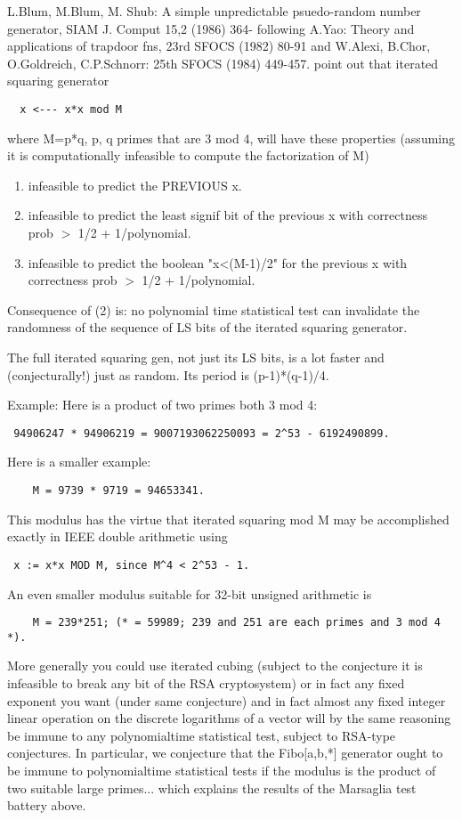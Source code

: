L.Blum, M.Blum, M. Shub: A simple unpredictable psuedo-random
number generator, SIAM J. Comput 15,2 (1986) 364-
following
A.Yao: Theory and applications of trapdoor fns, 23rd SFOCS (1982) 80-91
and
W.Alexi, B.Chor, O.Goldreich, C.P.Schnorr: 25th SFOCS (1984) 449-457.
point out that iterated squaring generator
\begin{verbatim}
  x <--- x*x mod M
\end{verbatim}
where M=p*q, p, q primes that are 3 mod 4, will have these properties
(assuming it is computationally infeasible to compute the factorization of M)
\begin{enumerate}
\item infeasible to predict the PREVIOUS x.
\item infeasible to predict the least signif bit of the
    previous x with correctness prob $>$ 1/2 + 1/polynomial.
\item infeasible to predict the boolean "x<(M-1)/2" for the
    previous x with correctness prob $>$ 1/2 + 1/polynomial.
\end{enumerate}
Consequence of (2) is: no polynomial time statistical test
can invalidate the randomness of the sequence of LS bits of
the iterated squaring generator. 

The full iterated squaring gen, not just its LS bits,
is a lot faster and (conjecturally!) just as random.
Its period is (p-1)*(q-1)/4.

Example: Here is a product of two primes both 3 mod 4:
\begin{verbatim}
 94906247 * 94906219 = 9007193062250093 = 2^53 - 6192490899.
\end{verbatim}
Here is a smaller example:
\begin{verbatim}
    M = 9739 * 9719 = 94653341.
\end{verbatim}
This modulus has the virtue that iterated squaring mod M
may be accomplished exactly in IEEE double arithmetic using
\begin{verbatim}
 x := x*x MOD M, since M^4 < 2^53 - 1.
\end{verbatim}
An even smaller modulus suitable for 32-bit unsigned arithmetic is
\begin{verbatim}
    M = 239*251; (* = 59989; 239 and 251 are each primes and 3 mod 4 *).
\end{verbatim}

More generally you could use iterated cubing (subject to the conjecture
it is infeasible to break any bit of the RSA cryptosystem) or in fact
any fixed exponent you want (under same conjecture) and in fact almost
any fixed integer linear operation on the discrete logarithms of a vector
will by the same reasoning be immune to any polynomialtime statistical test,
subject to RSA-type conjectures. In particular, we conjecture that the
Fibo[a,b,*] generator ought to be immune to polynomialtime statistical tests
if the modulus is the product of two suitable large primes... which
explains the results of the Marsaglia test battery above.





